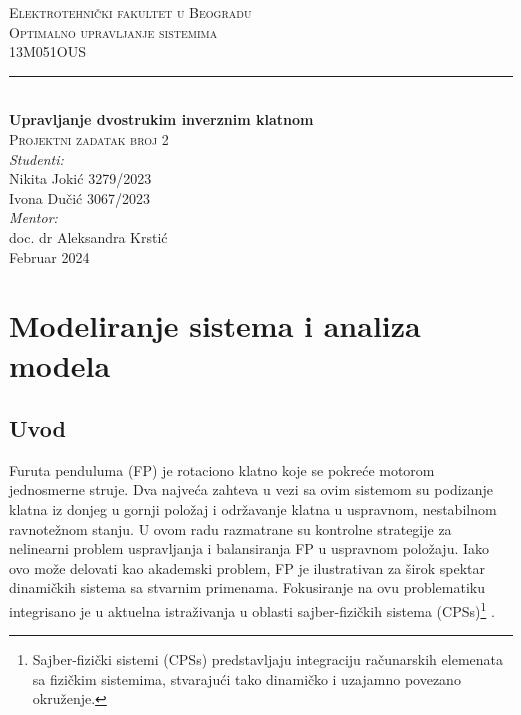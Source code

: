 \documentclass[a4paper,11pt]{article}
\theoremstyle{definition} \newtheorem{deff}{Definicija}[section]
\theoremstyle{definition} \newtheorem{prim}[deff]{Primer}
\theoremstyle{plain} \newtheorem{teor}[deff]{Teorema}
\begin{document}
	
	\begin{titlepage}
		
		\newcommand{\HRule}{\rule{\linewidth}{0.5mm}} 							%
		\center 
		
		\textsc{\LARGE Elektrotehnički fakultet u Beogradu}\\[1cm]
		
		\textsc{\Large Optimalno upravljanje sistemima}\\[0.2cm]
		\textsc{\large 13M051OUS}\\[1cm] 										
		\HRule \\[0.8cm]
		{ \huge \bfseries Upravljanje dvostrukim inverznim klatnom}\\[0.7cm]								%
		\textsc{\large Projektni zadatak broj 2}\\[1cm]
		
		
		\large
		\vfill 
		\emph{Studenti:}\\
		Nikita Jokić 3279/2023\\[0.1cm]
		Ivona Dučić 3067/2023\\[1.5cm]		
		\emph{Mentor:}\\
		doc. dr Aleksandra Krstić\\[0.1cm]									
		{\large Februar 2024}\\[2cm]
	\end{titlepage}
	\tableofcontents
	\newpage
	
	\section{Modeliranje sistema i analiza modela}
	\subsection{Uvod} 
	
	Furuta penduluma (FP) je rotaciono klatno koje se pokreće motorom jednosmerne struje. Dva najveća zahteva u vezi sa ovim sistemom su podizanje klatna iz donjeg u gornji položaj i održavanje klatna u uspravnom, nestabilnom ravnotežnom stanju. U ovom radu razmatrane su kontrolne strategije za nelinearni problem uspravljanja i balansiranja FP u uspravnom  položaju. Iako ovo može delovati kao akademski problem, FP je ilustrativan za širok spektar dinamičkih sistema sa stvarnim primenama. Fokusiranje na ovu problematiku integrisano je u aktuelna istraživanja u oblasti sajber-fizičkih sistema (CPSs)\footnote{Sajber-fizički sistemi (CPSs) predstavljaju integraciju računarskih elemenata sa fizičkim sistemima, stvarajući tako dinamičko i uzajamno povezano okruženje.} \cite{inicijalna}. \\ 
	
\end{document}
